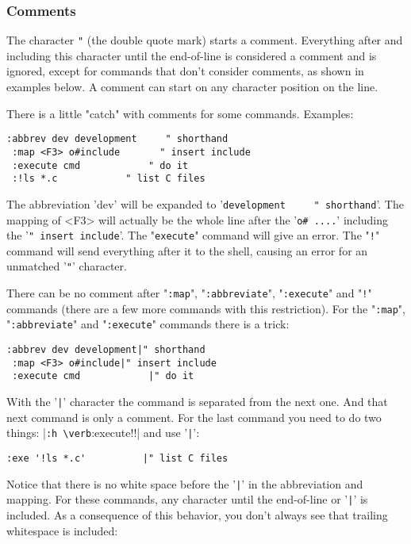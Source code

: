 \subsubsection{Comments}
The character \verb!"! (the double quote mark) starts a comment.
Everything after and including this character until the end-of-line is considered a comment and is ignored, except for commands that don't consider comments, as shown in examples below.
A comment can start on any character position on the line.

There is a little "catch" with comments for some commands.
Examples:

\begin{Verbatim}[samepage=true]
 :abbrev dev development     " shorthand
 :map <F3> o#include       " insert include
 :execute cmd            " do it
 :!ls *.c            " list C files
\end{Verbatim}

The abbreviation 'dev' will be expanded to '\verb!development     " shorthand!'.
The mapping of <F3> will actually be the whole line after the '\verb!o# ....!' including the '\verb!" insert include!'.
The "\verb!execute!" command will give an error.
The "\verb:!:" command will send everything after it to the shell, causing an error for an unmatched '\verb!"!' character.

There can be no comment after "\verb!:map!", "\verb!:abbreviate!", "\verb!:execute!" and "\verb:!:" commands (there are a few more commands with this restriction).
For the "\verb!:map!", "\verb!:abbreviate!" and "\verb!:execute!" commands there is a trick:

\begin{Verbatim}[samepage=true]
 :abbrev dev development|" shorthand
 :map <F3> o#include|" insert include
 :execute cmd            |" do it
\end{Verbatim}

With the '\verb!|!' character the command is separated from the next one.
And that next command is only a comment.
For the last command you need to do two things: |\verb!:h \verb!:execute!!| and use '\verb!|!':

\begin{Verbatim}[samepage=true]
 :exe '!ls *.c'          |" list C files
\end{Verbatim}

Notice that there is no white space before the '\verb!|!' in the abbreviation and mapping.
For these commands, any character until the end-of-line or '\verb!|!' is included.
As a consequence of this behavior, you don't always see that trailing whitespace is included:

